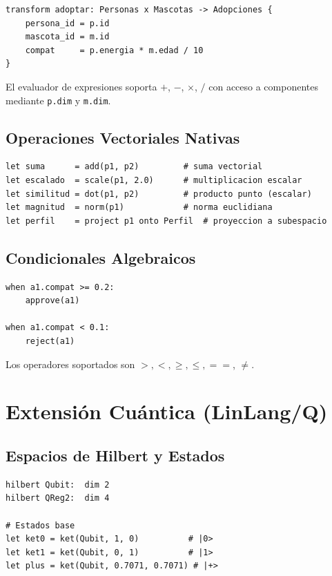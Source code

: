 \documentclass[12pt, a4paper, openany]{report}
\theoremstyle{definition}
\begin{document}
\begin{lstlisting}[caption={Transform declarativo}]
transform adoptar: Personas x Mascotas -> Adopciones {
    persona_id = p.id
    mascota_id = m.id
    compat     = p.energia * m.edad / 10
}
\end{lstlisting}

El evaluador de expresiones soporta $+$, $-$, $\times$, $/$ con acceso a componentes mediante \texttt{p.dim} y \texttt{m.dim}.

\subsection{Operaciones Vectoriales Nativas}

\begin{lstlisting}[caption={Operaciones sobre vectores}]
let suma      = add(p1, p2)         # suma vectorial
let escalado  = scale(p1, 2.0)      # multiplicacion escalar
let similitud = dot(p1, p2)         # producto punto (escalar)
let magnitud  = norm(p1)            # norma euclidiana
let perfil    = project p1 onto Perfil  # proyeccion a subespacio
\end{lstlisting}

\subsection{Condicionales Algebraicos}

\begin{lstlisting}[caption={Condicionales sobre componentes vectoriales}]
when a1.compat >= 0.2:
    approve(a1)

when a1.compat < 0.1:
    reject(a1)
\end{lstlisting}

Los operadores soportados son $>, <, \geq, \leq, ==$, $\neq$.

\section{Extensión Cuántica (LinLang/Q)}

\subsection{Espacios de Hilbert y Estados}

\begin{lstlisting}[caption={Declaración cuántica en LinLang/Q}]
hilbert Qubit:  dim 2
hilbert QReg2:  dim 4

# Estados base
let ket0 = ket(Qubit, 1, 0)          # |0>
let ket1 = ket(Qubit, 0, 1)          # |1>
let plus = ket(Qubit, 0.7071, 0.7071) # |+>
\end{lstlisting}
\end{document}
